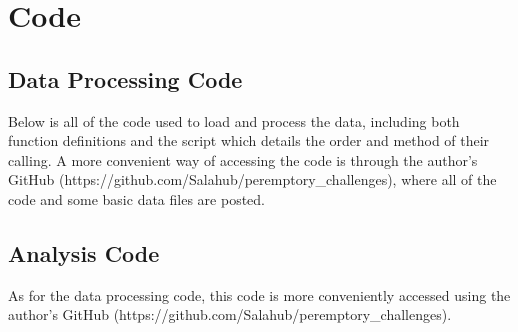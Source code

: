 \chapter{Code}
\label{app:code}

\section{Data Processing Code}\label{app:proccode}
Below is all of the code used to load and process the data, including both function definitions and the script which details the
order and method of their calling. A more convenient way of accessing the code is through the author's GitHub
(https://github.com/Salahub/peremptory\_challenges), where all of the code and some basic data files are posted.



\section{Analysis Code} \label{app:analysis}
As for the data processing code, this code is more conveniently accessed using the author's GitHub
(https://github.com/Salahub/peremptory\_challenges).


